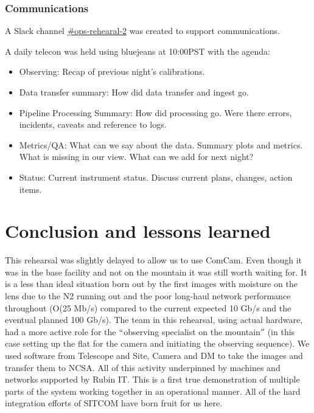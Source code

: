 \subsubsection{Communications }


A Slack channel \href{https://lsstc.slack.com/messages/CJBSY6FUN}{\#ops-rehearal-2} was created to support communications.

A daily telecon was held using bluejeans at 10:00PST with the agenda:
\begin{itemize}
\item Observing: Recap of previous night's calibrations.
\item Data transfer summary:  How did data transfer and ingest go.
\item Pipeline Processing Summary: 	How did processing go.  Were there errors, incidents, caveats and reference to logs.
\item Metrics/QA:  What can we say about the data. Summary plots and metrics.  What is missing in our view. What can we add for next night?
\item Status:   Current instrument status.  Discuss current plans, changes, action items.

\end{itemize}







\section{Conclusion and lessons learned}\label{sec:conc}
This rehearsal was slightly delayed to allow us to use ComCam. Even though it was in the base facility and not on
the mountain it was still worth waiting for.
It is a less than ideal situation born out by the first images with moisture on the lens due to the N2 running out
and the poor long-haul network performance throughout (O(25 Mb/s) compared to the current expected 10 Gb/s and the
eventual planned 100 Gb/s).
The team in this rehearsal, using actual hardware, had a more active role for the $``$observing specialist on the mountain$''$ (in this case setting up the flat for the camera and initiating the observing sequence).
We used software from Telescope and Site, Camera and DM to take the images and transfer them to NCSA.
All of this activity underpinned by machines and networks supported by Rubin IT.
This is a first true demonstration of multiple parts of the system working together in an operational manner.
All of the hard integration efforts of SITCOM have born fruit for us here.

